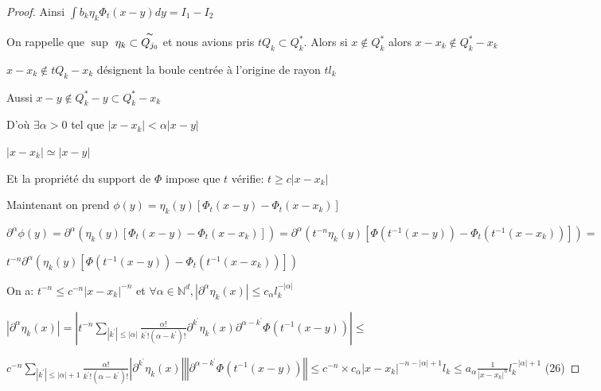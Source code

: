 \documentclass[12pt, a4paper, oneside]{article}
\begin{document}
\begin{proof}
	Ainsi $\int b_{k}\eta _{k}\Phi _{t}(x-y)dy=I_{1}-I_{2}$ 
	
	On rappelle que $\sup$ $\eta _{k}\subset \overset{\thicksim }{Q_{j_{0}}}$
	et nous avions pris $tQ_{k}\subset Q_{k}^{\ast }.$ Alors si $x\notin
	Q_{k}^{\ast }$ alors $x-x_{k}\notin Q_{k}^{\ast }-x_{k}$
	
	$x-x_{k}\notin tQ_{k}-x_{k}$ désignent la boule centrée à l'origine de rayon $tl_{k}$
	
	Aussi $x-y\notin Q_{k}^{\ast }-y\subset Q_{k}^{\ast }-x_{k}$
	
	D'où $\exists \alpha >0$ tel que $\left\vert x-x_{k}\right\vert <\alpha
	\left\vert x-y\right\vert $
	
	$\left\vert x-x_{k}\right\vert \simeq \left\vert x-y\right\vert $ 
	
	Et la propriété du support de $\Phi $ impose que $t$ vérifie: $
	t\geq c\left\vert x-x_{k}\right\vert $
	
	Maintenant on prend $\phi (y)=\eta _{k}(y)[\Phi _{t}(x-y)-\Phi _{t}(x-x_{k})]
	$
	
	$\partial ^{\alpha }\phi (y)=\partial ^{\alpha }(\eta _{k}(y)[\Phi
	_{t}(x-y)-\Phi _{t}(x-x_{k})])=\partial ^{\alpha }(t^{-n}\eta _{k}(y)[\Phi
	(t^{-1}(x-y))-\Phi _{t}(t^{-1}(x-x_{k}))])=$
	
	$t^{-n}\partial ^{\alpha }(\eta _{k}(y)[\Phi (t^{-1}(x-y))-\Phi
	_{t}(t^{-1}(x-x_{k}))])$
	
	On a: $t^{-n}\leq c^{-n}\left\vert x-x_{k}\right\vert ^{-n}$ et $\forall \alpha \in \mathbb{N}^{d},\left\vert \partial ^{\alpha }\eta _{k}(x)\right\vert \leq c_{\alpha
	}l_{k}^{-\left\vert \alpha \right\vert }$
	
	$\left\vert \partial ^{\alpha }\eta _{k}(x)\right\vert =\left\vert
	t^{-n}\sum\limits_{\left\vert k^{\prime }\right\vert \leq \left\vert \alpha
		\right\vert }\frac{\alpha !}{k^{\prime }!(\alpha -k^{\prime })!}\partial
	^{k^{\prime }}\eta _{k}(x)\partial ^{\alpha -k^{\prime }}\Phi
	(t^{-1}(x-y))\right\vert \leq $
	
	$c^{-n}\sum\limits_{\left\vert k^{\prime }\right\vert \leq \left\vert
		\alpha \right\vert +1}\frac{\alpha !}{k^{\prime }!(\alpha -k^{\prime })!}
	\left\vert \partial ^{k^{\prime }}\eta _{k}(x)\right\vert \left\Vert
	\partial ^{\alpha -k^{\prime }}\Phi (t^{-1}(x-y))\right\Vert \leq
	c^{-n}\times c_{\alpha }\left\vert x-x_{k}\right\vert ^{-n-\left\vert \alpha
		\right\vert +1}l_{k}\leq a_{\alpha }\frac{1}{\left\vert x-x_{k}\right\vert
		^{n}}l_{k}^{-\left\vert \alpha \right\vert +1}$ (26)
	

\end{proof}
\end{document}
